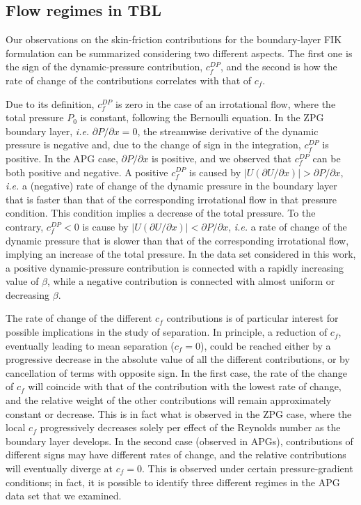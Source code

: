 \subsection{Flow regimes in TBL}
Our observations on the skin-friction contributions for the boundary-layer FIK formulation can be summarized considering two different aspects. The first one is the sign of the dynamic-pressure contribution, $c^{DP}_f$, and the second is how the rate of change of the contributions correlates with that of $c_f$.


Due to its definition, $c^{DP}_f$ is zero in the case of an irrotational flow, where the total pressure $P_0$ is constant, following the Bernoulli equation. In the ZPG boundary layer, \textit{i.e.\!} $\partial P / \partial x=0$, the streamwise derivative of the dynamic pressure is negative and, due to the change of sign in the integration, $c^{DP}_f$ is positive. In the APG case, $\partial P / \partial x$ is positive, and we observed that $c^{DP}_f$ can be both positive and negative. A positive $c^{DP}_f$ is caused by $|U (\partial U/\partial x)|>\partial P / \partial x$, \textit{i.e.\!} a (negative) rate of change of the dynamic pressure in the boundary layer that is faster than that of the corresponding irrotational flow in that pressure condition. This condition implies a decrease of the total pressure. To the contrary, $c^{DP}_f<0$ is cause by $|U (\partial U/\partial x)|<\partial P / \partial x$, \textit{i.e.\!} a rate of change of the dynamic pressure that is slower than that of the corresponding irrotational flow, implying an increase of the total pressure. In the data set considered in this work, a positive dynamic-pressure contribution is connected with a rapidly increasing value of $\beta$, while a negative contribution is connected with almost uniform or decreasing $\beta$. 


The rate of change of the different $c_f$ contributions is of particular interest for possible implications in the study of separation. In principle, a reduction of $c_f$, eventually leading to mean separation ($c_f=0$), could be reached either by a progressive decrease in the absolute value of all the different contributions, or by cancellation of terms with opposite sign. In the first case, the rate of the change of $c_f$ will coincide with that of the contribution with the lowest rate of change, and the relative weight of the other contributions will remain approximately constant or decrease. This is in fact what is observed in the ZPG case, where the local $c_f$ progressively decreases solely per effect of the Reynolds number as the boundary layer develops. In the second case (observed in APGs), contributions of different signs may have different rates of change, and the relative contributions will eventually diverge at $c_f=0$. This is observed under certain pressure-gradient conditions; in fact, it is possible to identify three different regimes in the APG data set that we examined. 


